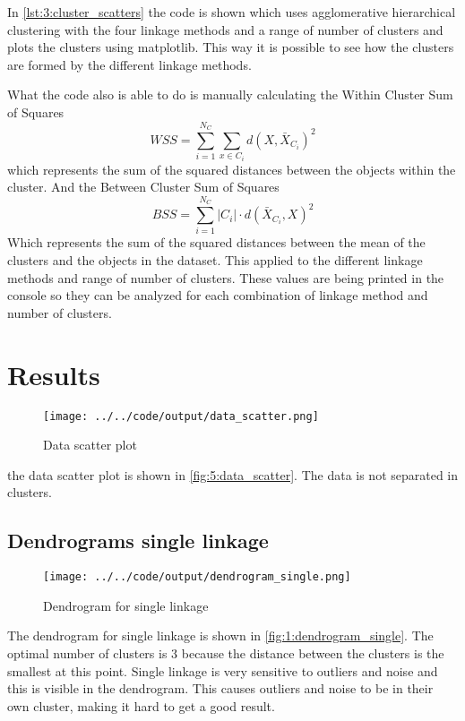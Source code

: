 \documentclass[twoside, a4paper, fleqn, reqno]{article}
\begin{document}
In \autoref{lst:3:cluster_scatters} the code is shown which uses agglomerative hierarchical clustering
with the four linkage methods and a range of number of clusters and plots the clusters using matplotlib.
This way it is possible to see how the clusters are formed by the different linkage methods.
\par
What the code also is able to do is manually calculating the Within Cluster Sum of Squares
\begin{equation*}
	WSS= \sum_{i = 1}^{N_C} \sum_{x \in C_i} d(X, \bar{X}_{C_i} )^2
\end{equation*}
which represents the sum of the squared distances between the objects within the cluster. 
And the Between Cluster Sum of Squares
\begin{equation*}
	BSS= \sum_{i = 1}^{N_C} \left\lvert C_i \right\rvert \cdot d(\bar{X}_{C_i},X)^2
\end{equation*}
Which represents the sum of the squared distances between the mean of the clusters and the objects in the dataset.
This applied to the different linkage methods and range of number of clusters.
These values are being printed in the console so they can be analyzed for each combination
of linkage method and number of clusters.

\section{Results}

\begin{figure}[H]
	\centering
	\texttt{[image: ../../code/output/data\_scatter.png]}
	\caption{Data scatter plot}
	\label{fig:5:data_scatter}
\end{figure}

the data scatter plot is shown in \autoref{fig:5:data_scatter}.
The data is not separated in clusters.

\subsection{Dendrograms single linkage}

\begin{figure}[H]
	\centering
	\texttt{[image: ../../code/output/dendrogram\_single.png]}
	\caption{Dendrogram for single linkage}
	\label{fig:1:dendrogram_single}
\end{figure}

The dendrogram for single linkage is shown in \autoref{fig:1:dendrogram_single}.
The optimal number of clusters is 3 because the distance between the clusters is the smallest at this point.
Single linkage is very sensitive to outliers and noise and this is visible in the dendrogram.
This causes outliers and noise to be in their own cluster, making it hard to get a good result.
\end{document}
